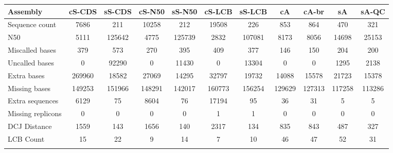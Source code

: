 \documentclass{bioinfo}
\begin{document}
\begin{table}[!t] 
{\begin{tabular}{l|cccccccccc}\toprule
Assembly           & cS-CDS & sS-CDS & cS-N50 & sS-N50 & cS-LCB & sS-LCB & cA     & cA-br  & sA     & sA-QC   \\\midrule
Sequence count     & 7686   & 211    & 10258  & 212    & 19508  & 226    & 853    & 864    & 470    & 321     \\
N50                & 5111   & 125642 & 4775   & 125739 & 2832   & 107081 & 8173   & 8056   & 14698  & 25153   \\
Miscalled bases    & 379    & 573    & 270    & 395    & 409    & 377    & 146    & 150    & 204    & 200     \\
Uncalled bases     & 0      & 92290  & 0      & 11430  & 0      & 13304  & 0      & 0      & 1295   & 2138    \\
Extra bases        & 269960 & 18582  & 27069  & 14295  & 32797  & 19732  & 14088  & 15578  & 21723  & 15378   \\
Missing bases      & 149253 & 151966 & 148291 & 142017 & 160773 & 156254 & 129629 & 127313 & 117258 & 113286  \\
Extra sequences    & 6129   & 75     & 8604   & 76     & 17194  & 95     & 36     & 31     & 5      & 5       \\
Missing replicons  & 0      & 0      & 0      & 0      & 1      & 1      & 0      & 0      & 0      & 0       \\
DCJ Distance       & 1559   & 143    & 1656   & 140    & 2317   & 134    & 835    & 843    & 487    & 327     \\
LCB Count          & 15     & 22     & 9      & 14     & 7      & 10     & 46     & 47     & 52     & 31      \\
\botrule \\
\end{tabular}}{}
\end{table}
\end{document}

